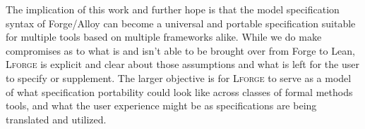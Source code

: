 The implication of this work and further hope is that the model specification syntax of Forge/Alloy can become a universal and portable specification suitable for multiple tools based on multiple frameworks alike. While we do make compromises as to what is and isn't able to be brought over from Forge to Lean, \textsc{Lforge} is explicit and clear about those assumptions and what is left for the user to specify or supplement. The larger objective is for \textsc{Lforge} to serve as a model of what specification portability could look like across classes of formal methods tools, and what the user experience might be as specifications are being translated and utilized. 